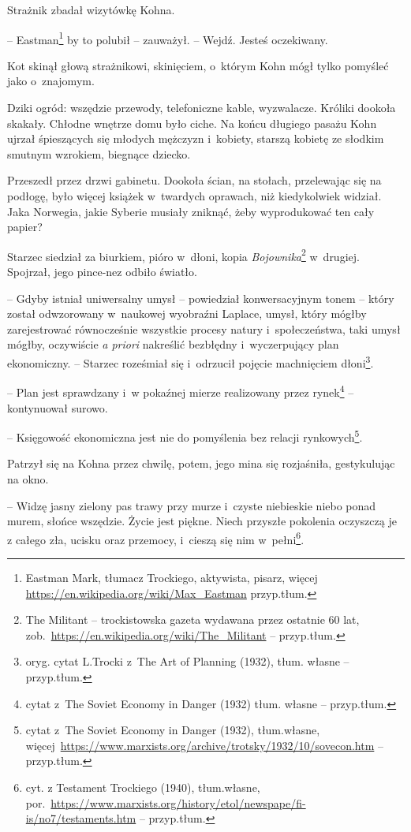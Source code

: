 \documentclass[oneside,polish,11pt,sfheadings]{mwbk}
\begin{document}
Strażnik zbadał wizytówkę Kohna.

-- Eastman\footnote{Eastman Mark, tłumacz Trockiego,
aktywista, pisarz, więcej \url{https://en.wikipedia.org/wiki/Max\_Eastman} 
przyp.tłum.} by to polubił -- zauważył. -- Wejdź. Jesteś oczekiwany.

Kot skinął głową strażnikowi, skinięciem, o~którym Kohn mógł tylko
pomyśleć jako o~znajomym.

Dziki ogród: wszędzie przewody, telefoniczne kable, wyzwalacze. Króliki
dookoła skakały. Chłodne wnętrze domu było ciche. Na końcu długiego
pasażu Kohn ujrzał śpieszących się młodych mężczyzn i~kobiety, starszą
kobietę ze słodkim smutnym wzrokiem, biegnące dziecko.

Przeszedł przez drzwi gabinetu. Dookoła ścian, na stołach, przelewając
się na podłogę, było więcej książek w~twardych oprawach, niż
kiedykolwiek widział. Jaka Norwegia, jakie Syberie musiały zniknąć, żeby
wyprodukować ten cały papier?

Starzec siedział za biurkiem, pióro w~dłoni, kopia \emph{Bojownika}\footnote{ The Militant -- trockistowska gazeta wydawana przez
ostatnie 60 lat,
zob.~\url{https://en.wikipedia.org/wiki/The\_Militant} -- przyp.tłum.} w~drugiej.  Spojrzał, jego pince-nez odbiło światło.

-- Gdyby istniał uniwersalny umysł -- powiedział konwersacyjnym tonem -- który został odwzorowany w~naukowej wyobraźni Laplace, umysł, który
mógłby zarejestrować równocześnie wszystkie procesy natury i~społeczeństwa, taki umysł mógłby, oczywiście \emph{a priori} nakreślić
bezbłędny i~wyczerpujący plan ekonomiczny. -- Starzec roześmiał się i~odrzucił pojęcie machnięciem dłoni\footnote{oryg. cytat L.Trocki z~The Art
of Planning (1932), tłum. własne -- przyp.tłum.}. 

-- Plan jest sprawdzany i~w pokaźnej mierze realizowany przez rynek\footnote{cytat z~The Soviet Economy in Danger (1932) tłum. własne -- przyp.tłum.}  -- kontynuował surowo.

-- Księgowość ekonomiczna jest nie do pomyślenia bez relacji rynkowych\footnote{cytat z~The Soviet Economy in Danger (1932), tłum.własne,
więcej~\url{https://www.marxists.org/archive/trotsky/1932/10/sovecon.htm}
-- przyp.tłum.}.

Patrzył się na Kohna przez chwilę, potem, jego mina się rozjaśniła,
gestykulując na okno.

-- Widzę jasny zielony pas trawy przy murze i~czyste niebieskie niebo
ponad murem, słońce wszędzie. Życie jest piękne. Niech przyszłe pokolenia oczyszczą je
z całego zła, ucisku oraz przemocy, i~cieszą się nim w~pełni\footnote{cyt. z Testament Trockiego (1940),
tłum.własne, por.~\url{https://www.marxists.org/history/etol/newspape/fi-is/no7/testaments.htm}
-- przyp.tłum.}.
\end{document}
